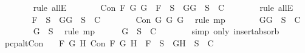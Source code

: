 \begin{isabellebody}
\ \ \ \ \ \ \isamarkupfalse%
\ {\isacharparenleft}rule\ allE{\isacharparenright}\isanewline
\ \ \ \ \isamarkupfalse%
\ \isamarkupfalse%
\ {\isachardoublequoteopen}Con\ {\isacharquery}F\ G\ G\ {\isasymlongrightarrow}\ {\isacharquery}F\ {\isasymin}\ S\ {\isasymlongrightarrow}\ {\isacharbraceleft}G{\isacharcomma}G{\isacharbraceright}\ {\isasymunion}\ S\ {\isasymin}\ C{\isachardoublequoteclose}\isanewline
\ \ \ \ \ \ \isamarkupfalse%
\ {\isacharparenleft}rule\ allE{\isacharparenright}\isanewline
\ \ \ \ \isamarkupfalse%
\ \isamarkupfalse%
\ {\isachardoublequoteopen}{\isacharquery}F\ {\isasymin}\ S\ {\isasymlongrightarrow}\ {\isacharbraceleft}G{\isacharcomma}G{\isacharbraceright}\ {\isasymunion}\ S\ {\isasymin}\ C{\isachardoublequoteclose}\isanewline
\ \ \ \ \ \ \isamarkupfalse%
\ {\isacartoucheopen}Con\ {\isacharparenleft}\isactrlbold {\isasymnot}{\isacharparenleft}\isactrlbold {\isasymnot}G{\isacharparenright}{\isacharparenright}\ G\ G{\isacartoucheclose}\ \isamarkupfalse%
\ {\isacharparenleft}rule\ mp{\isacharparenright}\isanewline
\ \ \ \ \isamarkupfalse%
\ \isamarkupfalse%
\ {\isachardoublequoteopen}{\isacharbraceleft}G{\isacharcomma}G{\isacharbraceright}\ {\isasymunion}\ S\ {\isasymin}\ C{\isachardoublequoteclose}\isanewline
\ \ \ \ \ \ \isamarkupfalse%
\ {\isacartoucheopen}{\isacharparenleft}\isactrlbold {\isasymnot}{\isacharparenleft}\isactrlbold {\isasymnot}G{\isacharparenright}{\isacharparenright}\ {\isasymin}\ S{\isacartoucheclose}\ \isamarkupfalse%
\ {\isacharparenleft}rule\ mp{\isacharparenright}\isanewline
\ \ \ \ \isamarkupfalse%
\ {\isachardoublequoteopen}{\isacharbraceleft}G{\isacharbraceright}\ {\isasymunion}\ S\ {\isasymin}\ C{\isachardoublequoteclose}\isanewline
\ \ \ \ \ \ \isamarkupfalse%
\ {\isacharparenleft}simp\ only{\isacharcolon}\ insert{\isacharunderscore}absorb{}{\isacharparenright}\isanewline
\ \ \isamarkupfalse%
\isanewline
{}\isamarkupfalse%
%
\endisatagproof
{\isafoldproof}%
%
\isadelimproof
\isanewline
%
\endisadelimproof
\isanewline
{}\isamarkupfalse%
\ pcp{\isacharunderscore}alt{}Con{}{\isacharcolon}\isanewline
\ \ \ {\isachardoublequoteopen}{\isasymforall}F\ G\ H{\isachardot}\ Con\ F\ G\ H\ {\isasymlongrightarrow}\ F\ {\isasymin}\ S\ {\isasymlongrightarrow}\ {\isacharbraceleft}G{\isacharcomma}H{\isacharbraceright}\ {\isasymunion}\ S\ {\isasymin}\ C{\isachardoublequoteclose}\isanewline

\end{isabellebody}
